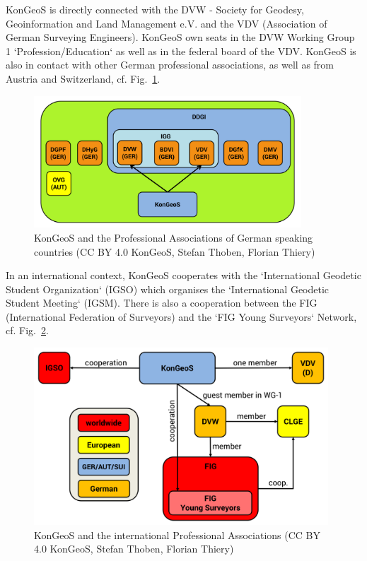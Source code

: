\documentclass[a4paper]{article}
\begin{document}
KonGeoS is directly connected with the DVW - Society for Geodesy, Geoinformation and Land Management e.V. and the VDV (Association of German Surveying Engineers). KonGeoS own seats in the DVW Working Group 1 `Profession/Education` as well as in the federal board of the VDV. KonGeoS is also in contact with other German professional associations, as well as from Austria and Switzerland, cf. Fig.~\ref{Abb2}.

\begin{figure}[!h]
\begin{center}
\includegraphics[width=10cm]{VerbandsUebersichtDeutschland.png}
\caption{KonGeoS and the Professional Associations of German speaking countries (CC BY 4.0 KonGeoS, Stefan Thoben, Florian Thiery)}
\label{Abb2}
\end{center}
\end{figure}

In an international context, KonGeoS cooperates with the `International Geodetic Student Organization` (IGSO) which organises the `International Geodetic Student Meeting` (IGSM). There is also a cooperation between the FIG (International Federation of Surveyors) and the `FIG Young Surveyors` Network, cf. Fig.~\ref{Abb3}.

\begin{figure}[!h]
\begin{center}
\includegraphics[width=11cm]{GeodaetischesNetzwerk.png}
\caption{KonGeoS and the international Professional Associations (CC BY 4.0 KonGeoS, Stefan Thoben, Florian Thiery)}
\label{Abb3}
\end{center}
\end{figure}
\end{document}
